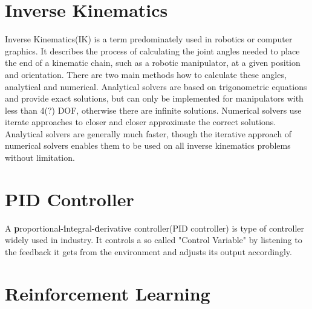 \section{Inverse Kinematics}
Inverse Kinematics(IK) is a term predominately used in robotics or computer graphics.
It describes the process of calculating the joint angles needed to place the end of a kinematic chain, such as a robotic manipulator, at a given position and orientation.
There are two main methods how to calculate these angles, analytical and numerical.
Analytical solvers are based on trigonometric equations and provide exact solutions, but can only be implemented for manipulators with less than 4(?) DOF, otherwise there are infinite solutions.
Numerical solvers use iterate approaches to closer and closer approximate the correct solutions.
Analytical solvers are generally much faster, though the iterative approach of numerical solvers enables them to be used on all inverse kinematics problems without limitation.





\section{PID Controller}
A \textbf{p}roportional-\textbf{i}ntegral-\textbf{d}erivative controller(PID controller) is type of controller widely used in industry.
It controls a so called "Control Variable" by listening to the feedback it gets from the environment and adjusts its output accordingly.
 


\section{Reinforcement Learning}
